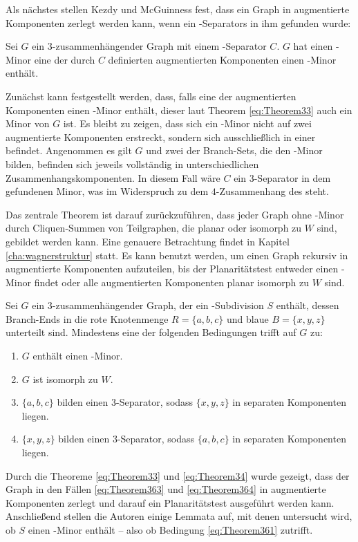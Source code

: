 Als nächstes stellen Kezdy und McGuinness fest, dass ein Graph in augmentierte Komponenten zerlegt werden kann, wenn ein \dd-Separators in ihm gefunden wurde:
\begin{theorem}\label{eq:Theorem34}
  Sei $G$ ein $3$-zusammenhängender Graph mit einem \dd-Separator $C$.
  $G$ hat einen \kf-Minor \gdw eine der durch $C$ definierten augmentierten Komponenten einen \kf-Minor enthält.
\end{theorem}
\begin{beweis}
  Zunächst kann festgestellt werden, dass, falls eine der augmentierten Komponenten einen \kf-Minor enthält, dieser laut Theorem \ref{eq:Theorem33} auch ein Minor von $G$ ist.
  Es bleibt zu zeigen, dass sich ein \kf-Minor nicht auf zwei augmentierte Komponenten erstreckt, sondern sich ausschließlich in einer befindet.
  Angenommen es gilt \kf \minor $G$ und zwei der Branch-Sets, die den \kf-Minor bilden, befinden sich jeweils vollständig in unterschiedlichen Zusammenhangskomponenten.
  In diesem Fall wäre $C$ ein $3$-Separator in dem gefundenen Minor, was im Widerspruch zu dem $4$-Zusammenhang des \kf steht.
\end{beweis}

Das zentrale Theorem ist darauf zurückzuführen, dass jeder Graph ohne \kf-Minor durch Cliquen-Summen von Teilgraphen, die planar oder isomorph zu $W$ sind, gebildet werden kann\cite{Wag37}.
Eine genauere Betrachtung findet in Kapitel \ref{cha:wagnerstruktur} statt.
Es kann benutzt werden, um einen Graph rekursiv in augmentierte Komponenten aufzuteilen, bis der Planaritätstest entweder einen \kf-Minor findet oder alle augmentierten Komponenten planar \bzw isomorph zu $W$ sind.
\begin{theorem}\label{eq:Theorem36}
  Sei $G$ ein $3$-zusammenhängender Graph, der ein \kdd-Subdivision $S$ enthält, dessen Branch-Ends in die rote Knotenmenge $R = \{a, b, c\}$ und blaue $B = \{x, y, z\}$ unterteilt sind.
  Mindestens eine der folgenden Bedingungen trifft auf $G$ zu:
  \begin{enumerate}
    \item $G$ enthält einen \kf-Minor.\label{eq:Theorem361}
    \item $G$ ist isomorph zu $W$.\label{eq:Theorem362}
    \item $\{a, b, c\}$ bilden einen $3$-Separator, sodass $\{x, y, z\}$ in separaten Komponenten liegen.\label{eq:Theorem363}
    \item $\{x, y, z\}$ bilden einen $3$-Separator, sodass $\{a, b, c\}$ in separaten Komponenten liegen.\label{eq:Theorem364}
  \end{enumerate}
\end{theorem}
Durch die Theoreme \ref{eq:Theorem33} und \ref{eq:Theorem34} wurde gezeigt, dass der Graph in den Fällen \ref{eq:Theorem363} und \ref{eq:Theorem364} in augmentierte Komponenten zerlegt und darauf ein Planaritätstest ausgeführt werden kann.
Anschließend stellen die Autoren einige Lemmata auf, mit denen untersucht wird, ob $S$ einen \kf-Minor enthält -- also ob Bedingung \ref{eq:Theorem361} zutrifft.

